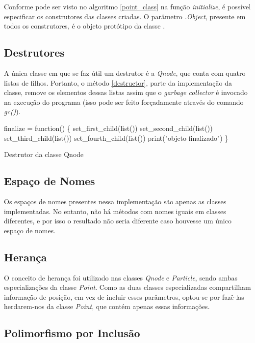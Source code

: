 \documentclass[rel_mlp]{iiufrgs}
\makeatletter
\newcommand{\nosemic}{\renewcommand{\@endalgocfline}{\relax}}%
\makeatother
\begin{document}
    Conforme pode ser visto no algoritmo \ref{point_class} na função \textit{initialize}, é possível
    especificar os construtores das classes criadas. O parâmetro \textit{.Object}, presente em todos
    os construtores, é o objeto protótipo da classe \cite{init_meth}.

\subsection{Destrutores}

    A única classe em que se faz útil um destrutor é a \textit{Qnode}, que conta com quatro listas
    de filhos. Portanto, o método \ref{destructor}, parte da implementação da classe, remove os elementos dessas listas assim que o
    \textit{garbage collector} é invocado na execução do programa (isso pode ser feito forçadamente
    através do comando \textit{gc()}).

\begin{algorithm}
\label{destructor}
  \nosemic finalize = function() {\{} \;
 \nosemic set{\_}first{\_}child(list()) \;
  \nosemic set{\_}second{\_}child(list()) \;
  \nosemic set{\_}third{\_}child(list()) \;
 \nosemic set{\_}fourth{\_}child(list()) \;
  \nosemic print("objeto finalizado") \;
  \nosemic {\}} \;
  \caption{Destrutor da classe Qnode}
  \end{algorithm}

\subsection{Espaço de Nomes}

    Os espaços de nomes presentes nessa implementação são apenas as classes implementadas. No entanto,
    não há métodos com nomes iguais em classes diferentes, e por isso o resultado não seria diferente
    caso houvesse um único espaço de nomes.

\subsection{Herança}

    O conceito de herança foi utilizado nas classes \textit{Qnode} e \textit{Particle}, sendo ambas
    especializações da classe \textit{Point}. Como as duas classes especializadas compartilham informação
    de posição, em vez de incluir esses parâmetros, optou-se por fazê-las herdarem-nos da classe \textit{Point},
    que contém apenas essas informações.

\subsection{Polimorfismo por Inclusão}
\end{document}
